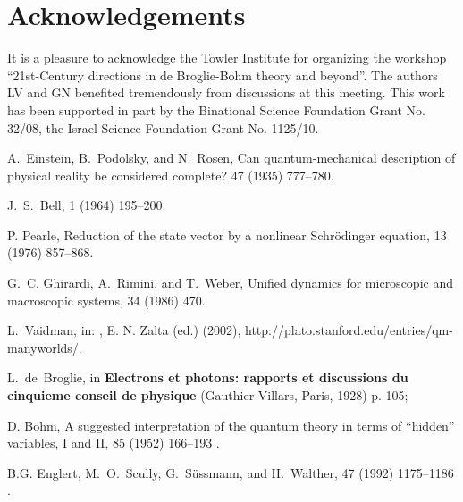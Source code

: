 \documentclass[preprint,tightenlines]{elsarticle}
\begin{document}
\section*{Acknowledgements}

It is a pleasure to acknowledge the Towler Institute for organizing
the workshop  ``21st-Century directions in de Broglie-Bohm theory
and beyond''. The authors LV and GN benefited tremendously from discussions
at this meeting. This work has been supported in part by the Binational
Science Foundation Grant No. 32/08, the Israel Science Foundation
Grant No. 1125/10.

\begin{thebibliography}{40}

A.~Einstein, B.~Podolsky, and N.~Rosen,
\newblock Can quantum-mechanical description of physical reality be considered
  complete?
  47 (1935) 777--780.

J.~S.~Bell,
  1 (1964) 195--200.

P. Pearle,
\newblock Reduction of the state vector by a nonlinear Schr\"odinger equation,
   13 (1976) 857--868.

G.~C. Ghirardi, A.~Rimini, and T.~Weber,
\newblock Unified dynamics for microscopic and macroscopic systems,
  34 (1986) 470.

L.~Vaidman,
 in:
, E. N. Zalta (ed.) (2002),  http://plato.stanford.edu/entries/qm-manyworlds/.

L.~de~Broglie,
\newblock in {\bf Electrons et photons: rapports et discussions du cinquieme conseil de physique} (Gauthier-Villars,
Paris, 1928) p. 105;

D. Bohm,
\newblock A suggested interpretation of the quantum theory in terms of ``hidden''
  variables, I and II,
  85 (1952) 166--193 .

B.G. Englert, M.~O.~Scully, G.~S\"{u}ssmann, and H.~Walther,
  47 (1992) 1175--1186 .



\end{thebibliography}
\end{document}
